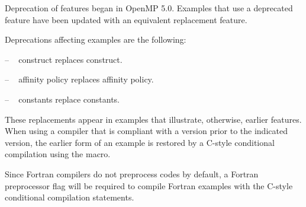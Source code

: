 \label{chap:deprecated_features}

Deprecation of features began in OpenMP 5.0. 
Examples that use a deprecated feature have been updated with an equivalent replacement feature.  

Deprecations affecting examples are the following:
\begin{description}[labelindent=5mm,font=\normalfont]
\item[5.1] -- \  construct          replaces  construct.
\item[5.1] -- \  affinity policy   replaces  affinity policy.
\item[5.0] -- \  constants replace   constants.
\end{description}

These replacements appear in examples that illustrate, otherwise, earlier features.
When using a compiler that is compliant with a version prior to 
the indicated version, the earlier form of
an example is restored by a C-style conditional compilation using the  macro.

Since Fortran compilers do not preprocess codes by default, a Fortran preprocessor
flag will be required to compile Fortran examples with the C-style conditional 
compilation statements.
